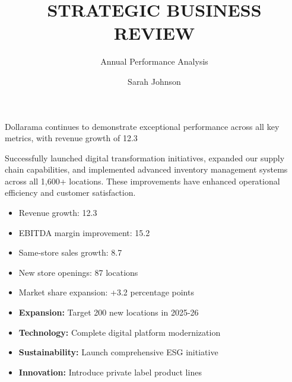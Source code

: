 \documentclass{dollarama}
\title{STRATEGIC BUSINESS REVIEW}
\subtitle{Annual Performance Analysis}
\author{Sarah Johnson}
\begin{document}
\maketitle


\tableofcontents
\clearpage


\begin{executivesummaryenv}
\vspace{0.3em}
Dollarama continues to demonstrate exceptional performance across all key metrics, with revenue growth of 12.3%

\vspace{1.2em}
\vspace{0.3em}
Successfully launched digital transformation initiatives, expanded our supply chain capabilities, and implemented advanced inventory management systems across all 1,600+ locations. These improvements have enhanced operational efficiency and customer satisfaction.

\vspace{1.2em}
\vspace{-1em}
\begin{itemize}
\item Revenue growth: 12.3%
\item EBITDA margin improvement: 15.2%
\item Same-store sales growth: 8.7%
\item New store openings: 87 locations
\item Market share expansion: +3.2 percentage points
\end{itemize}

\vspace{0.8em}
\vspace{-1em}
\begin{itemize}
\item \textbf{Expansion:} Target 200 new locations in 2025-26
\item \textbf{Technology:} Complete digital platform modernization
\item \textbf{Sustainability:} Launch comprehensive ESG initiative
\item \textbf{Innovation:} Introduce private label product lines
\end{itemize}


\end{executivesummaryenv}
\end{document}
